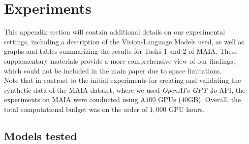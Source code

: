\section{Experiments}
\label{sec:appendixB}
This appendix section will contain additional details on our experimental settings, including a description of the Vision-Language Models used, as well as graphs and tables summarizing the results for Tasks 1 and 2 of MAIA. These supplementary materials provide a more comprehensive view of our findings, which could not be included in the main paper due to space limitations.\\
Note that in contrast to the initial experiments for creating and validating the synthetic data of the MAIA dataset, where we used \textit{OpenAI}'s \textit{GPT-4o} API, the experiments on MAIA were conducted using A$100$ GPUs ($40$GB). Overall, the total computational budget was on the order of \~{$1,000$} GPU hours.

\subsection{Models tested}
\label{sec:models_app}

